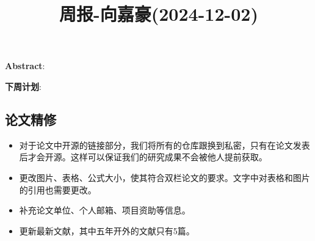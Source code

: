 \documentclass[11pt,a4paper]{article}
\title{周报-向嘉豪(2024-12-02)}
\renewcommand{\maketitle}{
  \begin{center}
    \LARGE\bfseries\thetitle
  \end{center}
}
\begin{document}
\maketitle


\noindent \textbf{Abstract}: 

\noindent \textbf{下周计划}: 

\subsection{论文精修}

\begin{itemize}
  \item 对于论文中开源的链接部分，我们将所有的仓库跟换到私密，只有在论文发表后才会开源。这样可以保证我们的研究成果不会被他人提前获取。
  \item 更改图片、表格、公式大小，使其符合双栏论文的要求。文字中对表格和图片的引用也需要更改。
  \item 补充论文单位、个人邮箱、项目资助等信息。
  \item 更新最新文献，其中五年开外的文献只有5篇。
\end{itemize}






% 
% 
\end{document}
